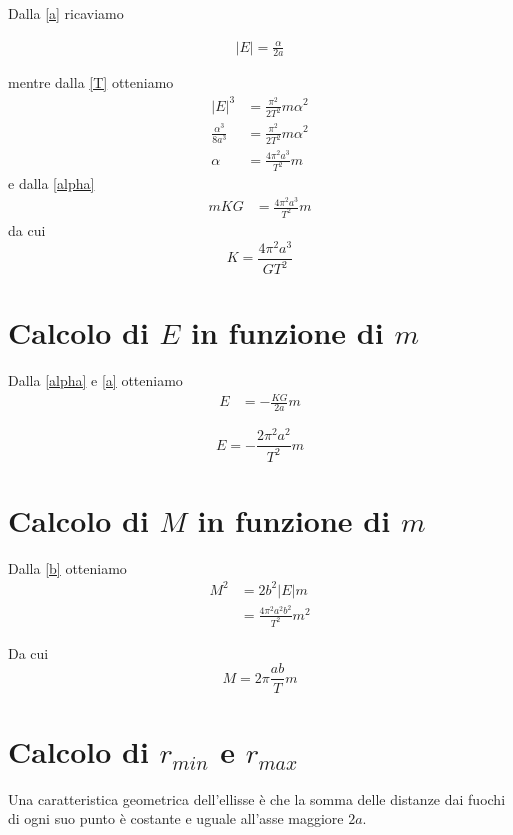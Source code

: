 \documentclass[a4paper,11pt]{article}
\begin{document}
Dalla \eqref{a} ricaviamo

\begin{align*}
	|E| = \frac{\alpha}{2 a}
\end{align*}

mentre dalla \eqref{T} otteniamo
\begin{align*}
	|E|^3 & = \frac{\pi^2}{2 T^2} m \alpha^2 \\
	\frac{\alpha^3}{8 a^3} & = \frac{\pi^2}{2 T^2} m \alpha^2\\
	\alpha & = \frac{4 \pi^2 a^3}{T^2} m
\end{align*}
e dalla \eqref{alpha}
\begin{align*}
	m K G & = \frac{4 \pi^2 a^3}{T^2} m
\end{align*}
da cui
\begin{equation}
\label{K} K = \frac{4 \pi^2 a^3}{G T^2}
\end{equation}

\section{Calcolo di $E$ in funzione di $m$}

Dalla \eqref{alpha} e \eqref{a} otteniamo
\begin{align*}
 E & = - \frac{ K G}{2 a} m
\end{align*}

\begin{equation}
\label{E} E = - \frac{ 2 \pi^2 a^2}{T^2} m
\end{equation}

\section{Calcolo di $M$ in funzione di $m$}

Dalla \eqref{b} otteniamo
\begin{align*}
M^2 & = 2 b^2 |E| m\\
 & = \frac{4 \pi^2 a^2 b^2}{T^2} m^2
\end{align*}

Da cui
\begin{equation}
\label{M} M = 2 \pi \frac{a b}{T} m
\end{equation}

\section{Calcolo di $r_{min}$ e $r_{max}$ }

Una caratteristica geometrica dell'ellisse è che la somma delle distanze dai fuochi di ogni suo punto è costante e uguale all'asse maggiore $ 2 a $.
\end{document}

